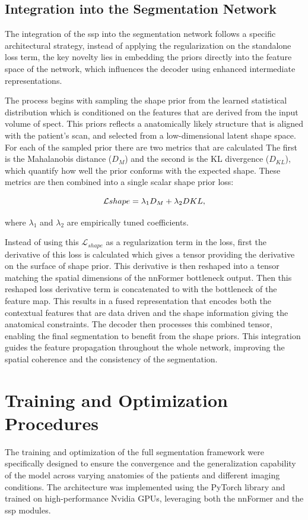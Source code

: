 \subsection{Integration into the Segmentation Network}
The integration of the \gls{ssp} into the segmentation network follows a specific architectural strategy, instead of applying the regularization on the standalone loss term, the key novelty lies in embedding the priors directly into the feature space of the network, which influences the decoder using enhanced intermediate representations. 

The process begins with sampling the shape prior from the learned statistical distribution which is conditioned on the features that are derived from the input volume of \gls{spect}. This priors reflects a anatomically likely structure that is aligned with the patient's scan, and selected from a low-dimensional latent shape space. For each of the sampled prior there are two metrics that are calculated The first is the Mahalanobis distance ($D_M$) and the second is the KL divergence ($D_{KL}$), which quantify how well the prior conforms with the expected shape. These metrics are then combined into a single scalar shape prior loss:

\begin{equation}
\addcontentsline{equ}{equations}{\protect\numberline{\theequation}Combined Shape Loss} 
\mathcal{L}{shape} = \lambda_1 D_M + \lambda_2 D{KL}, 
\end{equation}

where $\lambda_1$ and $\lambda_2$ are empirically tuned coefficients.

Instead of using this $\mathcal{L}_{shape}$ as a regularization term in the loss, first the derivative of this loss is calculated which gives a tensor providing the derivative on the surface of shape prior. This derivative is then reshaped into a tensor matching the spatial dimensions of the nnFormer bottleneck output. Then this reshaped loss derivative term is concatenated to with the bottleneck of the feature map. This results in a fused representation that encodes both the contextual features that are data driven and the shape information giving the anatomical constraints. The decoder then processes this combined tensor, enabling the final segmentation to benefit from the shape priors. This integration guides the feature propagation throughout the whole network, improving the spatial coherence and the consistency of the segmentation.

\section{Training and Optimization Procedures}
The training and optimization of the full segmentation framework were specifically designed to ensure the convergence and the generalization capability of the model across varying anatomies of the patients and different imaging conditions. The architecture was implemented using the PyTorch library and trained on high-performance Nvidia GPUs, leveraging both the nnFormer and the \gls{ssp} modules.

